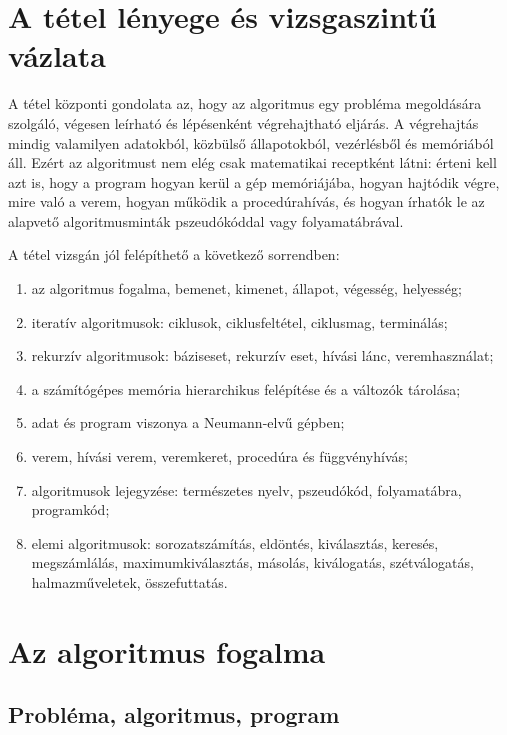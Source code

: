 \section{A tétel lényege és vizsgaszintű vázlata}

\begin{summarybox}
A tétel központi gondolata az, hogy az algoritmus egy probléma megoldására szolgáló, végesen leírható és lépésenként végrehajtható eljárás. A végrehajtás mindig valamilyen adatokból, közbülső állapotokból, vezérlésből és memóriából áll. Ezért az algoritmust nem elég csak matematikai receptként látni: érteni kell azt is, hogy a program hogyan kerül a gép memóriájába, hogyan hajtódik végre, mire való a verem, hogyan működik a procedúrahívás, és hogyan írhatók le az alapvető algoritmusminták pszeudókóddal vagy folyamatábrával.
\end{summarybox}

A tétel vizsgán jól felépíthető a következő sorrendben:

\begin{enumerate}
  \item az algoritmus fogalma, bemenet, kimenet, állapot, végesség, helyesség;
  \item iteratív algoritmusok: ciklusok, ciklusfeltétel, ciklusmag, terminálás;
  \item rekurzív algoritmusok: báziseset, rekurzív eset, hívási lánc, veremhasználat;
  \item a számítógépes memória hierarchikus felépítése és a változók tárolása;
  \item adat és program viszonya a Neumann-elvű gépben;
  \item verem, hívási verem, veremkeret, procedúra és függvényhívás;
  \item algoritmusok lejegyzése: természetes nyelv, pszeudókód, folyamatábra, programkód;
  \item elemi algoritmusok: sorozatszámítás, eldöntés, kiválasztás, keresés, megszámlálás, maximumkiválasztás, másolás, kiválogatás, szétválogatás, halmazműveletek, összefuttatás.
\end{enumerate}

\section{Az algoritmus fogalma}

\subsection{Probléma, algoritmus, program}

